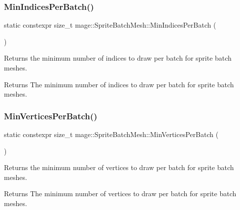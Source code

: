 \subsubsection{\texorpdfstring{Min\+Indices\+Per\+Batch()}{MinIndicesPerBatch()}}
{\footnotesize\ttfamily static constexpr size\+\_\+t mage\+::\+Sprite\+Batch\+Mesh\+::\+Min\+Indices\+Per\+Batch (\begin{DoxyParamCaption}{ }\end{DoxyParamCaption})\hspace{0.3cm}{\ttfamily [static]}}

Returns the minimum number of indices to draw per batch for sprite batch meshes.

\begin{DoxyReturn}{Returns}
The minimum number of indices to draw per batch for sprite batch meshes. 
\end{DoxyReturn}
\hypertarget{classmage_1_1_sprite_batch_mesh_a950ee2612c64733397fec4d03f12a531}{}\label{classmage_1_1_sprite_batch_mesh_a950ee2612c64733397fec4d03f12a531} 
\subsubsection{\texorpdfstring{Min\+Vertices\+Per\+Batch()}{MinVerticesPerBatch()}}
{\footnotesize\ttfamily static constexpr size\+\_\+t mage\+::\+Sprite\+Batch\+Mesh\+::\+Min\+Vertices\+Per\+Batch (\begin{DoxyParamCaption}{ }\end{DoxyParamCaption})\hspace{0.3cm}{\ttfamily [static]}}

Returns the minimum number of vertices to draw per batch for sprite batch meshes.

\begin{DoxyReturn}{Returns}
The minimum number of vertices to draw per batch for sprite batch meshes. 
\end{DoxyReturn}
\hypertarget{classmage_1_1_sprite_batch_mesh_ac6b9c2c79286f736d9a91a79cfa70044}{}\label{classmage_1_1_sprite_batch_mesh_ac6b9c2c79286f736d9a91a79cfa70044} 
